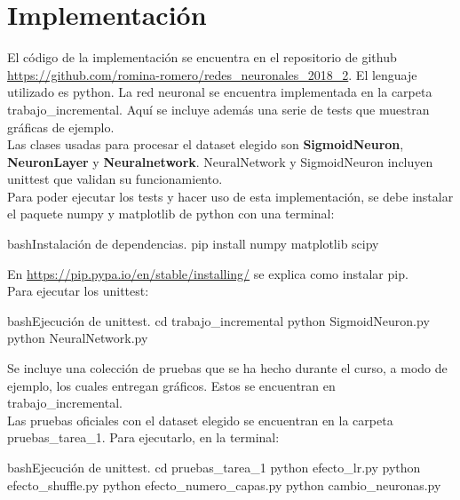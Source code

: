 \documentclass[letterpaper,11pt]{article} %
\begin{document}








\section{Implementación}

El código de la implementación se encuentra en el repositorio de github \url{https://github.com/romina-romero/redes_neuronales_2018_2}. El lenguaje utilizado es python. La red neuronal se encuentra implementada en la carpeta trabajo\_incremental. Aquí se incluye además una serie de tests que muestran gráficas de ejemplo. \\

Las clases usadas para procesar el dataset elegido son \textbf{SigmoidNeuron}, \textbf{NeuronLayer} y \textbf{Neuralnetwork}. NeuralNetwork y SigmoidNeuron incluyen unittest que validan su funcionamiento. \\

Para poder ejecutar los tests y hacer uso de esta implementación, se debe instalar el paquete numpy y matplotlib de python con una terminal:
\begin{sourcecode}[\label{instalacion}]{bash}{Instalación de dependencias.}
pip install numpy matplotlib scipy
\end{sourcecode}

En \url{https://pip.pypa.io/en/stable/installing/} se explica como instalar pip.\\

Para ejecutar los unittest:
\begin{sourcecode}[\label{instalacion}]{bash}{Ejecución de unittest.}
cd trabajo_incremental
python SigmoidNeuron.py
python NeuralNetwork.py
\end{sourcecode}

Se incluye una colección de pruebas que se ha hecho durante el curso, a modo de ejemplo, los cuales entregan gráficos. Estos se encuentran en trabajo\_incremental.\\

Las pruebas oficiales con el dataset elegido se encuentran en la carpeta pruebas\_tarea\_1. Para ejecutarlo, en la terminal:
\begin{sourcecode}[\label{instalacion}]{bash}{Ejecución de unittest.}
cd pruebas_tarea_1
python efecto_lr.py
python efecto_shuffle.py
python efecto_numero_capas.py
python cambio_neuronas.py
\end{sourcecode}
\end{document}
